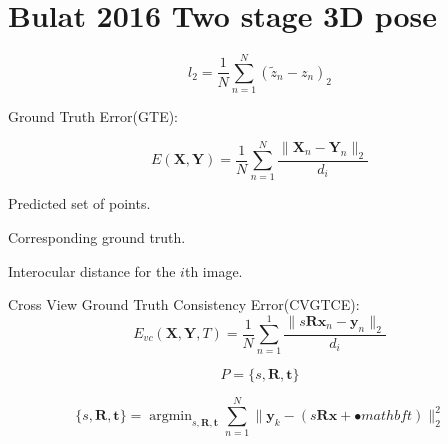 \documentclass[11pt, a4paper, oneside]{article}
\DeclareMathOperator*{\argmin}{argmin}
\begin{document}
\bigskip

\part*{Bulat 2016 Two stage 3D pose}

\begin{equation}
l_2 = \frac{1}{N} \sum_{n=1}^N (\tilde{z}_n - z_n) _2
\tag{}
\end{equation}

\bigskip

\noindent
Ground Truth Error(GTE):

\begin{equation}
E( \mathbf{X}, \mathbf{Y})
= \frac{1}{N} \sum_{n=1}^N \frac{\| \mathbf{X}_n - \mathbf{Y}_n \|_2}{d_i}
\tag{}
\end{equation}

\begin{description}[labelwidth=\widthof{\bfseries 123456789012345},align=parright]
	\item[$\mathbf{X}$:] Predicted set of points.
	\item[$\mathbf{Y}$:] Corresponding ground truth.
	\item[$d_i$:] Interocular distance for the $i$th image.
\end{description}

\bigskip

\noindent
Cross View Ground Truth Consistency Error(CVGTCE):
\begin{equation}
E_{vc}( \mathbf{X}, \mathbf{Y}, T )
=\frac{1}{N} \sum_{n=1}^1 \frac{\| s\mathbf{Rx}_n - \mathbf{y}_n \|_2}{d_i}
\tag{}
\end{equation}

\begin{equation}
P = \{ s, \mathbf{R}, \mathbf{t} \}
\tag{}
\end{equation}

\begin{equation}
\{ s, \mathbf{R}, \mathbf{t} \}
= \argmin_{s, \mathbf{R}, \mathbf{t}}
\sum_{n=1}^N \| \mathbf{y}_k - (s \mathbf{Rx} + \mathbf{•}mathbf{t}) \|_2 ^2
\end{equation}
\end{document}
